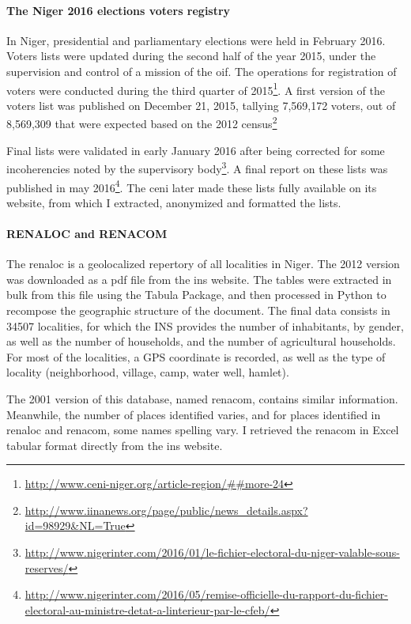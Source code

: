 \paragraph{The Niger 2016 elections voters registry} In Niger, presidential and parliamentary elections were held in February 2016. Voters lists were updated during the second half of the year 2015, under the supervision and control of a mission of the \gls{oif}. The operations for registration of voters were conducted during the third quarter of 2015\footnote{\url{http://www.ceni-niger.org/article-region/##more-24}}.
A first version of the voters list was published on December 21, 2015, tallying 7,569,172 voters, out of 8,569,309 that were expected based on the 2012 census\footnote{\url{http://www.iinanews.org/page/public/news_details.aspx?id=98929&NL=True}}

Final lists were validated in early January 2016 after being corrected for some incoherencies noted by the supervisory body\footnote{\url{http://www.nigerinter.com/2016/01/le-fichier-electoral-du-niger-valable-sous-reserves/}}.
A final report on these lists was published in may 2016\footnote{\url{http://www.nigerinter.com/2016/05/remise-officielle-du-rapport-du-fichier-electoral-au-ministre-detat-a-linterieur-par-le-cfeb/}}.
The \gls{ceni} later made these lists fully available on its website, from which I extracted, anonymized and formatted the lists.

\paragraph{RENALOC and RENACOM} The \gls{renaloc} is a geolocalized repertory of all localities in Niger.  The 2012 version was downloaded as a pdf file from the \gls{ins} website. The tables were extracted in bulk from this file using the Tabula Package, and then processed in Python to recompose the geographic structure of the document. The final data consists in 34507 localities, for which the INS provides the number of inhabitants, by gender, as well as the number of households, and the number of agricultural households. For most of the localities, a GPS coordinate is recorded, as well as the type of locality (neighborhood, village, camp, water well, hamlet).

The 2001 version of this database, named \gls{renacom}, contains similar information. Meanwhile, the number of places identified varies, and for places identified in \gls{renaloc} and \gls{renacom}, some names spelling vary. I retrieved the \gls{renacom} in Excel tabular format directly from the \gls{ins} website.

